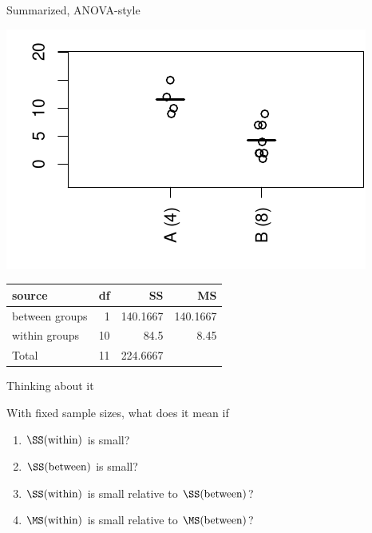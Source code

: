 \begin{frame}{Summarized, ANOVA-style}

  \begin{center}
    \includegraphics{dots4ex.pdf}

    \vspace{2em}

    \begin{tabular}{lrrr}
      source & df & SS & MS \\
      \hline
      between groups & 1 & 140.1667 & 140.1667 \\
      within groups & 10 & 84.5 & 8.45 \\
      \hline
      Total & 11 & 224.6667 &  \\
    \end{tabular}

  \end{center}

\end{frame}

\begin{frame}{Thinking about it}

  With fixed sample sizes, what does it mean if
  \begin{enumerate}
    \item $\SS(\text{within})$ is small?
    \item $\SS(\text{between})$ is small?
    \item $\SS(\text{within})$ is small relative to $\SS(\text{between})$?
    \item $\MS(\text{within})$ is small relative to $\MS(\text{between})$?
  \end{enumerate}

\end{frame}

